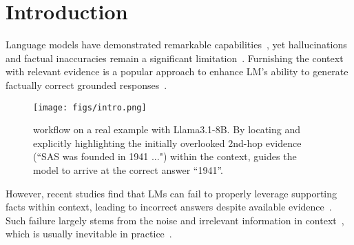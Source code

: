 \section{Introduction}\label{sec:int}

Language models have demonstrated remarkable capabilities~\cite{openai2022intro,openai2023gpt,llmchallenges}, yet hallucinations and factual inaccuracies remain a significant limitation~\cite{ji2023survey,wang2023survey}. Furnishing the context with relevant evidence is a popular approach to enhance LM's ability to generate factually correct grounded responses~\cite{incontext_rag,activerag}.
\begin{figure}[t]
    \centering
    \texttt{[image: figs/intro.png]}
    \caption{
        \se workflow on a real example with Llama3.1-8B.
        By locating and explicitly highlighting the initially overlooked 2nd-hop evidence (“SAS was founded in 1941 ...") within the context, \se guides the model to arrive at the correct answer “1941”.
    }
    \label{fig:intro}
    \vspace{-10pt}
\end{figure}
However, recent studies find that LMs can fail to properly leverage supporting facts within context, leading to incorrect answers despite available evidence~\cite{shi2024cad,zhao2024cd}.
Such failure largely stems from the noise and irrelevant information in context~\cite{wu2024ragirrelevant, cuconasu2024ragnoise}, which is usually inevitable in practice~\cite{gao2023ragsurvey}.

